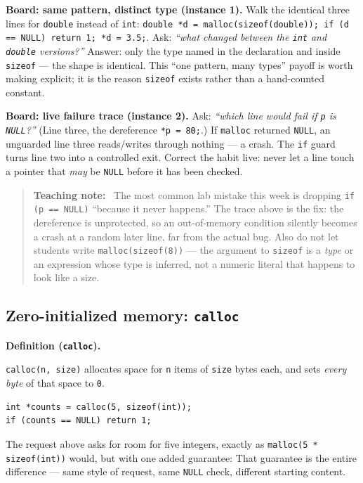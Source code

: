 \documentclass[11pt]{article}
\newenvironment{definitionbox}[1]{%
  \par\noindent\textbf{Definition (#1).}\ \itshape
}{\par\vspace{0.3em}}
\newenvironment{teachingaside}{\begin{quote}\small\color{primary-gold}\textbf{Teaching note:}\ }{\end{quote}}
\begin{document}
\textbf{Board: same pattern, distinct type (instance 1).} Walk the identical three lines for \texttt{double} instead of \texttt{int}: \texttt{double *d = malloc(sizeof(double)); if (d == NULL) return 1; *d = 3.5;}. Ask: \emph{``what changed between the \texttt{int} and \texttt{double} versions?''} Answer: only the type named in the declaration and inside \texttt{sizeof} --- the shape is identical. This ``one pattern, many types'' payoff is worth making explicit; it is the reason \texttt{sizeof} exists rather than a hand-counted constant.

\textbf{Board: live failure trace (instance 2).} Ask: \emph{``which line would fail if \texttt{p} is \texttt{NULL}?''} (Line three, the dereference \texttt{*p = 80;}.) If \texttt{malloc} returned \texttt{NULL}, an unguarded line three reads/writes through nothing --- a crash. The \texttt{if} guard turns line two into a controlled exit. Correct the habit live: never let a line touch a pointer that \emph{may} be \texttt{NULL} before it has been checked.

\begin{teachingaside}
The most common lab mistake this week is dropping \texttt{if (p == NULL)} ``because it never happens.'' The trace above is the fix: the dereference is unprotected, so an out-of-memory condition silently becomes a crash at a random later line, far from the actual bug. Also do not let students write \texttt{malloc(sizeof(8))} --- the argument to \texttt{sizeof} is a \emph{type} or an expression whose type is inferred, not a numeric literal that happens to look like a size.
\end{teachingaside}

\subsection{Zero-initialized memory: \texttt{calloc}}
\label{sec:calloc}

\begin{definitionbox}{\texttt{calloc}}
\texttt{calloc(n, size)} allocates space for \texttt{n} items of \texttt{size} bytes each, and sets \emph{every byte} of that space to \texttt{0}.
\end{definitionbox}
\begin{verbatim}
int *counts = calloc(5, sizeof(int));
if (counts == NULL) return 1;
\end{verbatim}
The request above asks for room for five integers, exactly as \texttt{malloc(5 * sizeof(int))} would, but with one added guarantee:  That guarantee is the entire difference --- same style of request, same \texttt{NULL} check, different starting content.
\end{document}
